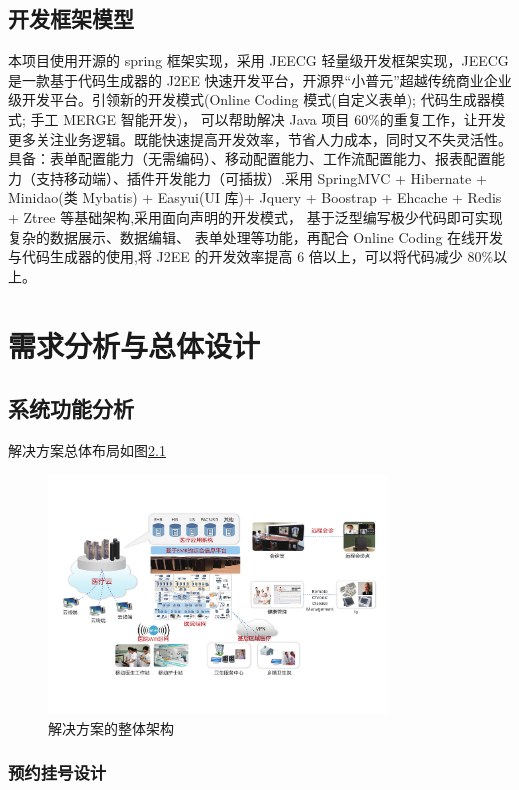 \documentclass[doctor,secret]{thuthesis}
\begin{document}
\section{开发框架模型}
\label{sec:org5bb8e5c}
本项目使用开源的 spring 框架实现，采用 JEECG 轻量级开发框架实现，JEECG 是一款基于代码生成器的 J2EE 快速开发平台，开源界“小普元”超越传统商业企业级开发平台。引领新的开发模式(Online Coding 模式(自定义表单); 代码生成器模式; 手工 MERGE 智能开发)， 可以帮助解决 Java 项目 60\%的重复工作，让开发更多关注业务逻辑。既能快速提高开发效率，节省人力成本，同时又不失灵活性。具备：表单配置能力（无需编码）、移动配置能力、工作流配置能力、报表配置能力（支持移动端）、插件开发能力（可插拔）.采用 SpringMVC + Hibernate + Minidao(类 Mybatis) + Easyui(UI 库)+ Jquery + Boostrap + Ehcache + Redis + Ztree 等基础架构,采用面向声明的开发模式， 基于泛型编写极少代码即可实现复杂的数据展示、数据编辑、 表单处理等功能，再配合 Online Coding 在线开发与代码生成器的使用,将 J2EE 的开发效率提高 6 倍以上，可以将代码减少 80\%以上。
\chapter{需求分析与总体设计}
\label{sec:org204ce82}
\section{系统功能分析}
\label{sec:org64fab55}
解决方案总体布局如图\ref{fig:generalscheme}

\begin{figure}[htbp]
\centering
\includegraphics[width=0.8\textwidth]{figures/general-framework.pdf}
\caption{解决方案的整体架构 \label{fig:generalscheme}}
\end{figure} 

\subsection{预约挂号设计}
\label{sec:orgf00f40e}
\end{document}
